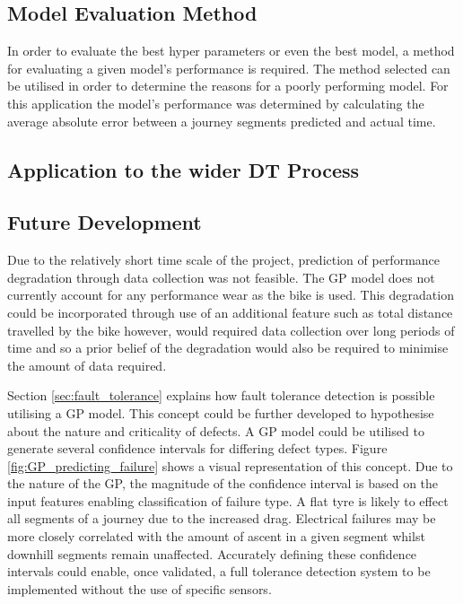 \documentclass[a4paper, 10pt]{article}
\numberwithin{equation}{section}
\begin{document}
\subsection{Model Evaluation Method}

In order to evaluate the best hyper parameters or even the best model, a method for evaluating a given model's performance is required. The method selected can be utilised in order to determine the reasons for a poorly performing model. For this application the model's performance was determined by calculating the average absolute error between a journey segments predicted and actual time.  


\subsection{Application to the wider DT Process}
\subsection{Future Development}

Due to the relatively short time scale of the project, prediction of performance degradation through data collection was not feasible. The GP model does not currently account for any performance wear as the bike is used. This degradation could be incorporated through use of an additional feature such as total distance travelled by the bike however, would required data collection over long periods of time and so a prior belief of the degradation would also be required to minimise the amount of data required.



Section \ref{sec:fault_tolerance} explains how fault tolerance detection is possible utilising a GP model. This concept could be further developed to hypothesise about the nature and criticality of defects. A GP model could be utilised to generate several confidence intervals for differing defect types. Figure \ref{fig:GP_predicting_failure} shows a visual representation of this concept. Due to the nature of the GP, the magnitude of the confidence interval is based on the input features enabling classification of failure type. A flat tyre is likely to effect all segments of a journey due to the increased drag. Electrical failures may be more closely correlated with the amount of ascent in a given segment whilst downhill segments remain unaffected. Accurately defining these confidence intervals could enable, once validated, a full tolerance detection system to be implemented without the use of specific sensors.  
\end{document}
